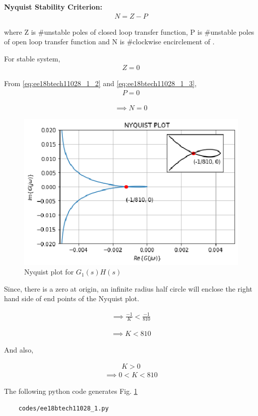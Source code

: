 \begin{enumerate}[label=\thesection.\arabic*.,ref=\thesection.\theenumi]
\textbf{Nyquist Stability Criterion:}
\begin{align}
    N = Z - P
\end{align}

where Z is \#unstable poles of closed loop transfer function, P is \#unstable poles of open loop transfer function
and N is \#clockwise encirclement of .

For stable system, 
\begin{align}
    Z = 0
\end{align}

From \ref{eq:ee18btech11028_1_2} and \ref{eq:ee18btech11028_1_3},
\begin{align}
    P = 0
\end{align}

\begin{align}
    \implies N = 0
\end{align}



\begin{figure}[!h]
\includegraphics[width=\columnwidth]{./figs/ee18btech11028/ee18btech11028_1.eps}
  \caption{Nyquist plot for $G_{1}(s)H(s)$}
  \label{fig:ee18btech11028_2_fig1}
\end{figure}

Since, there is a zero at origin, an infinite radius half circle will enclose the right hand side of end points of the Nyquist plot.

\begin{align}
    \implies \frac{-1}{K} < \frac{-1}{810}
\end{align}

\begin{align}
    \implies K < 810
\end{align}

And also,

\begin{align}
    K > 0
\end{align}
\begin{align}
    \implies 0 < K < 810     
\end{align}


The following python code generates  Fig. \ref{fig:ee18btech11028_2_fig1}
\begin{lstlisting}
    codes/ee18btech11028_1.py
\end{lstlisting}
\end{enumerate}